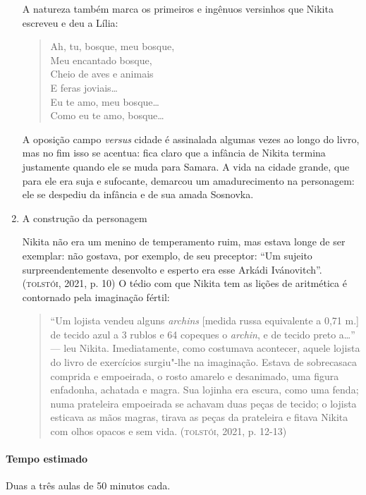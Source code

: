 \documentclass[11pt]{extarticle}
\begin{document}
\begin{enumerate}
A natureza também marca os primeiros e ingênuos versinhos que Nikita
escreveu e deu a Lília:

\begin{verse}
Ah, tu, bosque, meu bosque,\\
Meu encantado bosque,\\
Cheio de aves e animais\\
E feras joviais\ldots{}\\
Eu te amo, meu bosque\ldots{}\\
Como eu te amo, bosque\ldots{}
\end{verse}

A oposição campo \emph{versus} cidade é assinalada algumas vezes ao
longo do livro, mas no fim isso se acentua: fica claro que a infância de
Nikita termina justamente quando ele se muda para Samara. A vida na
cidade grande, que para ele era suja e sufocante, demarcou um
amadurecimento na personagem: ele se despediu da infância e de sua amada
Sosnovka.

\item
A construção da personagem

Nikita não era um menino de temperamento ruim, mas estava longe de ser
exemplar: não gostava, por exemplo, de seu preceptor: ``Um sujeito
surpreendentemente desenvolto e esperto era esse Arkádi Ivánovitch''.
(\textsc{tolstói}, 2021, p. 10) O tédio com que Nikita tem as lições de
aritmética é contornado pela imaginação fértil:

\begin{quote}
``Um lojista vendeu alguns \emph{archins} {[}medida russa equivalente a
0,71 m.{]} de tecido azul a 3 rublos e 64 copeques o \emph{archin}, e de
tecido preto a\ldots{}'' --- leu Nikita. Imediatamente, como costumava
acontecer, aquele lojista do livro de exercícios surgiu"-lhe na
imaginação. Estava de sobrecasaca comprida e empoeirada, o rosto amarelo
e desanimado, uma figura enfadonha, achatada e magra. Sua lojinha era
escura, como uma fenda; numa prateleira empoeirada se achavam duas peças
de tecido; o lojista esticava as mãos magras, tirava as peças da
prateleira e fitava Nikita com olhos opacos e sem vida.
(\textsc{tolstói}, 2021, p. 12-13)
\end{quote}
\end{enumerate}

\paragraph{Tempo estimado} Duas a três aulas de 50 minutos cada.
\end{document}
